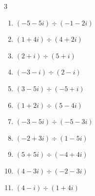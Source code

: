 \begin{multicols}{3}
\begin{enumerate}

  \item $\displaystyle (-5-5i)\div(-1-2i)$

        \phantom{$\displaystyle =3-i$}

\columnbreak %

\resetques

  \item $\displaystyle (1+4i)\div(4+2i)$


  \item $\displaystyle (2+i)\div(5+i)$


  \item $\displaystyle (-3-i)\div(2-i)$

        \phantom{$\displaystyle =-1-i$}

  \item $\displaystyle (3-5i)\div(-5+i)$


  \item $\displaystyle (1+2i)\div(5-4i)$


  \item $\displaystyle (-3-5i)\div(-5-3i)$


  \item $\displaystyle (-2+3i)\div(1-5i)$


  \item $\displaystyle (5+5i)\div(-4+4i)$


  \item $\displaystyle (4-3i)\div(-2-3i)$


  \item $\displaystyle (4-i)\div(1+4i)$

        \phantom{$\displaystyle =-i$}


\end{enumerate}
\end{multicols}
